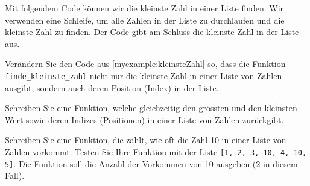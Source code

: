 \begin{myexample}\label{myexample:kleinsteZahl}
Mit folgendem Code können wir die kleinste Zahl in einer Liste finden. Wir verwenden eine Schleife, um alle Zahlen in der Liste zu durchlaufen und die kleinste Zahl zu finden. Der Code gibt am Schluss die kleinste Zahl in der Liste aus.

\end{myexample}


\begin{myexercise}
	Verändern Sie den Code aus \cref{myexample:kleinsteZahl} so, dass die Funktion \lstinline|finde_kleinste_zahl| nicht nur die kleinste Zahl in einer Liste von Zahlen ausgibt, sondern auch deren Position (Index) in der Liste.
	\begin{myanswer}
		
	\end{myanswer}
\end{myexercise}

\begin{myexercise}
	Schreiben Sie eine Funktion, welche gleichzeitig den grössten und den kleinsten Wert sowie deren Indizes (Positionen) in einer Liste von Zahlen zurückgibt.
	\begin{myanswer}
		
	\end{myanswer}
\end{myexercise}

\begin{myexercise}
	Schreiben Sie eine Funktion, die zählt, wie oft die Zahl 10 in einer Liste von Zahlen vorkommt. Testen Sie Ihre Funktion mit der Liste \lstinline|[1, 2, 3, 10, 4, 10, 5]|. Die Funktion soll die Anzahl der Vorkommen von 10 ausgeben (2 in diesem Fall).
	\begin{myanswer}
		
	\end{myanswer}
\end{myexercise}

